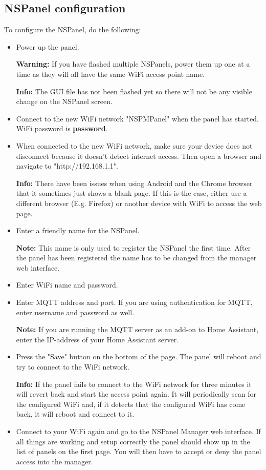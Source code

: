 \documentclass[10pt]{article}
\newcommand{\info}[1]{\begin{infoBox} \textbf{Info:} #1 \end{infoBox}}
\newcommand{\note}[1]{\begin{noteBox} \textbf{Note:} #1 \end{noteBox}}
\newcommand{\warning}[1]{\begin{hintBox} \textbf{Warning:} #1 \end{hintBox}}
\begin{document}
    \subsection{NSPanel configuration}
    \label{sec:nspanel_configuration}
    To configure the NSPanel, do the following:
    \begin{itemize}
      \item Power up the panel.
      \warning{If you have flashed multiple NSPanels, power them up one at a time as they will all have the same WiFi access point name.}
      \info{The GUI file has not been flashed yet so there will not be any visible change on the NSPanel screen.}
      \item Connect to the new WiFi network "NSPMPanel" when the panel has started. WiFi password is \textbf{password}.
      \item When connected to the new WiFi network, make sure your device does not disconnect because it doesn't detect internet access. Then open a browser and navigate to "http://192.168.1.1".
      \info{There have been issues when using Android and the Chrome browser that it sometimes just shows a blank page. If this is the case, either use a different browser (E.g. Firefox) or another device with WiFi to access the web page.}
      \item Enter a friendly name for the NSPanel.
      \note{This name is only used to register the NSPanel the first time. After the panel has been registered the name has to be changed from the manager web interface.}
      \item Enter WiFi name and password.
      \item Enter MQTT address and port. If you are using authentication for MQTT, enter username and password as well.
      \note{If you are running the MQTT server as an add-on to Home Assistant, enter the IP-address of your Home Assistant server.}
      \item Press the "Save" button on the bottom of the page. The panel will reboot and try to connect to the WiFi network.
      \info{If the panel fails to connect to the WiFi network for three minutes it will revert back and start the access point again. It will periodically scan for the configured WiFi and, if it detects that the configured WiFi has come back, it will reboot and connect to it.}
      \item Connect to your WiFi again and go to the NSPanel Manager web interface. If all things are working and setup correctly the panel should show up in the list of panels on the first page. You will then have to accept or deny the panel access into the manager.

\end{itemize}
\end{document}

